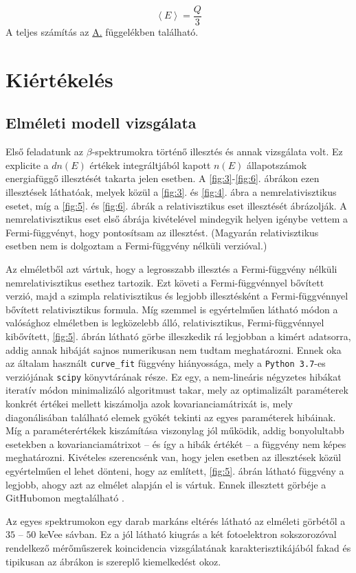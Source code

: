 \begin{multicols}{2}
\begin{equation} \label{eq:18}
\left< E \right>
=
\frac{Q}{3}
\end{equation}
A teljes számítás az \hyperref[appendix:A]{A.} függelékben található.

\section{Kiértékelés}
\subsection{Elméleti modell vizsgálata}
Első feladatunk az $\beta$-spektrumokra történő illesztés és annak vizsgálata volt. Ez explicite a $dn \left( E \right)$ értékek integráltjából kapott $n \left( E \right)$ állapotszámok energiafüggő illesztését takarta jelen esetben. A \ref{fig:3}-\ref{fig:6}. ábrákon ezen illesztések láthatóak, melyek közül a \ref{fig:3}. és \ref{fig:4}. ábra a nemrelativisztikus esetet, míg a \ref{fig:5}. és \ref{fig:6}. ábrák a relativisztikus eset illesztését ábrázolják. A nemrelativisztikus eset első ábrája kivételével mindegyik helyen igénybe vettem a Fermi-függvényt, hogy pontosítsam az illesztést. (Magyarán relativisztikus esetben nem is dolgoztam a Fermi-függvény nélküli verzióval.) \par
Az elméletből azt vártuk, hogy a legrosszabb illesztés a Fermi-függvény nélküli nemrelativisztikus esethez tartozik. Ezt követi a Fermi-függvénnyel bővített verzió, majd a szimpla relativisztikus és legjobb illesztésként a Fermi-függvénnyel bővített relativisztikus formula. Míg szemmel is egyértelműen látható módon a valósághoz elméletben is legközelebb álló, relativisztikus, Fermi-függvénnyel kibővített, \ref{fig:5}. ábrán látható görbe illeszkedik rá legjobban a kimért adatsorra, addig annak hibáját sajnos numerikusan nem tudtam meghatározni. Ennek oka az általam használt \texttt{curve\_fit} függvény hiányossága, mely a \texttt{Python 3.7}-es verziójának \texttt{scipy} könyvtárának része. Ez egy, a nem-lineáris négyzetes hibákat iteratív módon minimalizáló algoritmust takar, mely az optimalizált paraméterek konkrét értékei mellett kiszámolja azok kovarianciamátrixát is, mely diagonálisában található elemek gyökét tekinti az egyes paraméterek hibáinak. Míg a paraméterértékek kiszámítása viszonylag jól működik, addig bonyolultabb esetekben a kovarianciamátrixot -- és így a hibák értékét -- a függvény nem képes meghatározni. Kivételes szerencsénk van, hogy jelen esetben az illesztések közül egyértelműen el lehet dönteni, hogy az említett, \ref{fig:5}. ábrán látható függvény a legjobb, ahogy azt az elmélet alapján el is vártuk. Ennek illesztett görbéje a GitHubomon megtalálható \citep{github}. \par
Az egyes spektrumokon egy darab markáns eltérés látható az elméleti görbétől a $35$ -- $50$ keVee sávban. Ez a jól látható kiugrás a két fotoelektron sokszorozóval rendelkező mérőműszerek koincidencia vizsgálatának karakterisztikájából fakad és tipikusan az ábrákon is szereplő kiemelkedést okoz.


\end{multicols}
